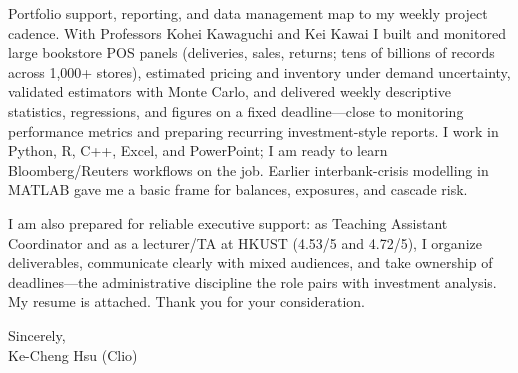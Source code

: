 \documentclass[11pt,letterpaper]{article}
\begin{document}
Portfolio support, reporting, and data management map to my weekly project cadence. With Professors Kohei Kawaguchi and Kei Kawai I built and monitored large bookstore POS panels (deliveries, sales, returns; tens of billions of records across 1{,}000+ stores), estimated pricing and inventory under demand uncertainty, validated estimators with Monte Carlo, and delivered weekly descriptive statistics, regressions, and figures on a fixed deadline---close to monitoring performance metrics and preparing recurring investment-style reports. I work in Python, R, C++, Excel, and PowerPoint; I am ready to learn Bloomberg/Reuters workflows on the job. Earlier interbank-crisis modelling in MATLAB gave me a basic frame for balances, exposures, and cascade risk.

I am also prepared for reliable executive support: as Teaching Assistant Coordinator and as a lecturer/TA at HKUST (4.53/5 and 4.72/5), I organize deliverables, communicate clearly with mixed audiences, and take ownership of deadlines---the administrative discipline the role pairs with investment analysis. My resume is attached. Thank you for your consideration.

\vspace{0.3em}
Sincerely,\\[0.25em]
Ke-Cheng Hsu (Clio)
\end{document}
